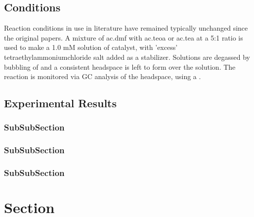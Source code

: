 \subsection{Conditions}

Reaction conditions in use in literature have remained typically unchanged since the original papers. A mixture of \gls{ac.dmf} with \gls{ac.teoa} or \gls{ac.tea} at a 5:1 ratio is used to make a 1.0 mM solution of catalyst, with 'excess'  tetraethylammoniumchloride  salt added as a stabilizer. Solutions are degassed by bubbling of  and a consistent headspace is left to form over the solution. The reaction is monitored via GC analysis of the headspace, using a . 

\subsection{Experimental Results}

\subsubsection{SubSubSection}

\subsubsection{SubSubSection}

\subsubsection{SubSubSection}

\section{Section}

